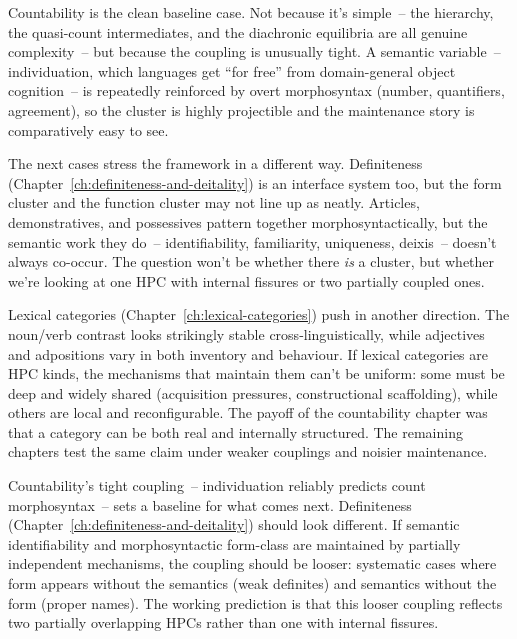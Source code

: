 Countability is the clean baseline case. Not because it's simple~-- the hierarchy, the quasi-count intermediates, and the diachronic equilibria are all genuine complexity~-- but because the coupling is unusually tight. A semantic variable~-- individuation, which languages get \enquote{for free} from domain-general object cognition~-- is repeatedly reinforced by overt morphosyntax (number, quantifiers, agreement), so the cluster is highly projectible and the maintenance story is comparatively easy to see.

The next cases stress the framework in a different way. Definiteness (Chapter~\ref{ch:definiteness-and-deitality}) is an interface system too, but the form cluster and the function cluster may not line up as neatly. Articles, demonstratives, and possessives pattern together morphosyntactically, but the semantic work they do~-- identifiability, familiarity, uniqueness, deixis~-- doesn't always co-occur. The question won't be whether there \emph{is} a cluster, but whether we're looking at one HPC with internal fissures or two partially coupled ones.

Lexical categories (Chapter~\ref{ch:lexical-categories}) push in another direction. The noun/verb contrast looks strikingly stable cross-linguistically, while adjectives and adpositions vary in both inventory and behaviour. If lexical categories are HPC kinds, the mechanisms that maintain them can't be uniform: some must be deep and widely shared (acquisition pressures, constructional scaffolding), while others are local and reconfigurable. The payoff of the countability chapter was that a category can be both real and internally structured. The remaining chapters test the same claim under weaker couplings and noisier maintenance.

\begin{definitenessthread}
Countability's tight coupling~-- individuation reliably predicts count morphosyntax~-- sets a baseline for what comes next. Definiteness (Chapter~\ref{ch:definiteness-and-deitality}) should look different. If semantic identifiability and morphosyntactic form-class are maintained by partially independent mechanisms, the coupling should be looser: systematic cases where form appears without the semantics (weak definites) and semantics without the form (proper names). The working prediction is that this looser coupling reflects two partially overlapping HPCs rather than one with internal fissures.
\end{definitenessthread}
